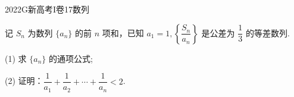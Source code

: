 
\begin{problem}{2022}{G}{新高考I卷}{17}{数列}

记 $S_n$ 为数列 $\{a_n\}$ 的前 $n$ 项和，已知 $a_1=1, \left\{\dfrac{S_n}{a_n}\right\}$ 是公差为 $\dfrac{1}{3}$ 的等差数列.

(1) 求 $\{a_n\}$ 的通项公式;

(2) 证明：$\dfrac{1}{a_1}+\dfrac{1}{a_2}+\cdots+\dfrac{1}{a_n}<2$.

\end{problem}